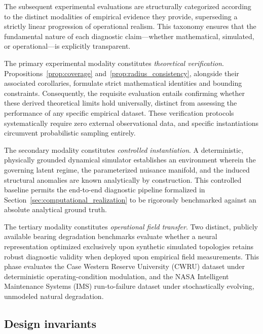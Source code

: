 \documentclass[a4paper]{cas-sc}
\begin{document}
The subsequent experimental evaluations are structurally categorized according to the distinct modalities of empirical evidence they provide, superseding a strictly linear progression of operational realism. This taxonomy ensures that the fundamental nature of each diagnostic claim—whether mathematical, simulated, or operational—is explicitly transparent.

The primary experimental modality constitutes \emph{theoretical verification}. Propositions~\ref{prop:coverage} and~\ref{prop:radius_consistency}, alongside their associated corollaries, formulate strict mathematical identities and bounding constraints. Consequently, the requisite evaluation entails confirming whether these derived theoretical limits hold universally, distinct from assessing the performance of any specific empirical dataset. These verification protocols systematically require zero external observational data, and specific instantiations circumvent probabilistic sampling entirely.

The secondary modality constitutes \emph{controlled instantiation}. A deterministic, physically grounded dynamical simulator establishes an environment wherein the governing latent regime, the parameterized nuisance manifold, and the induced structural anomalies are known analytically by construction. This controlled baseline permits the end-to-end diagnostic pipeline formalized in Section~\ref{sec:computational_realization} to be rigorously benchmarked against an absolute analytical ground truth.

The tertiary modality constitutes \emph{operational field transfer}. Two distinct, publicly available bearing degradation benchmarks evaluate whether a neural representation optimized exclusively upon synthetic simulated topologies retains robust diagnostic validity when deployed upon empirical field measurements. This phase evaluates the Case Western Reserve University (CWRU) dataset under deterministic operating-condition modulation, and the NASA Intelligent Maintenance Systems (IMS) run-to-failure dataset under stochastically evolving, unmodeled natural degradation.

\subsection{Design invariants}
\label{subsec:design_invariants}
\end{document}
